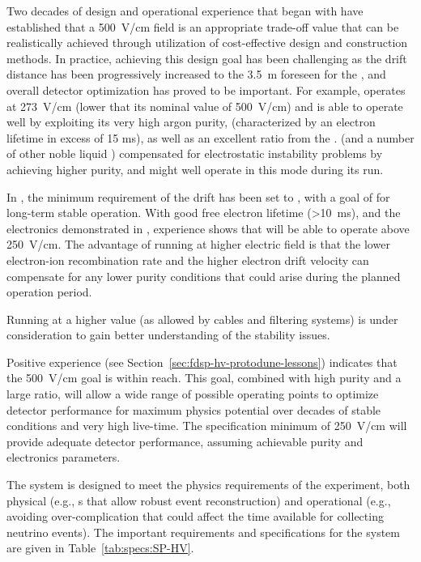 Two decades of design and operational experience that began with  have established that a \SI{500}{V/cm} field is an appropriate trade-off value that can be realistically achieved through utilization of cost-effective design and construction methods. In practice, achieving this design goal has been challenging as the drift distance has been progressively increased to the 
\SI{3.5}{m} foreseen for the , and overall detector optimization has proved to be important. For example,  operates  at \SI{273}{V/cm} (lower that its nominal value of \SI{500}{V/cm}) and is able to operate well by exploiting its very high argon purity, (characterized by an electron lifetime in excess of 15 ms), as well as an excellent  ratio from the  .  
 (and a number of other noble liquid ) compensated for electrostatic instability problems by achieving higher purity, and  might well operate in this mode during its run. 

In , the minimum requirement of the drift \efield has been set to \mindriftfield, with a goal 
of \mindriftfieldgoal for long-term stable operation. With good free electron lifetime (>\SI{10}{ms}), and the electronics  demonstrated in , experience shows that  will be able to operate above \SI{250}{V/cm}. The advantage of running at higher electric field is that the lower electron-ion recombination rate and the higher electron drift velocity can compensate for any lower purity conditions that could arise during the planned operation period.

 Running  at a higher  value (as allowed by  cables and filtering systems) is under consideration to gain better understanding of the  stability issues.

Positive  experience (see  Section~\ref{sec:fdsp-hv-protodune-lessons}) indicates that the \SI{500}{V/cm} \efield goal is within reach. This goal, combined with high  purity and a large  ratio, will allow  a wide range of possible operating points to optimize detector performance for maximum physics potential over decades of stable conditions and very high live-time. 
The specification minimum of \SI{250}{V/cm} will provide adequate detector performance, assuming achievable purity and electronics parameters. 

The  system is designed to meet the physics requirements of the  experiment,  both physical  (e.g., \efield{}s that allow robust event reconstruction) and operational (e.g., avoiding over-complication that could affect 
the time available for collecting neutrino events). 
The important requirements and specifications for the  system are given in Table~\ref{tab:specs:SP-HV}. 

